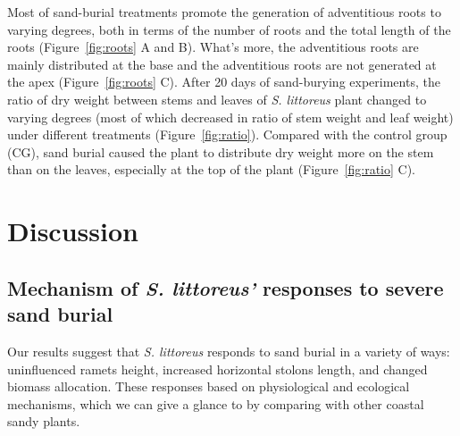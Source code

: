 \documentclass[]{interact}
\theoremstyle{plain}%
\theoremstyle{definition}
\theoremstyle{remark}
\begin{document}
Most of sand-burial treatments promote the generation of adventitious roots to varying degrees, both in terms of the number of roots and the total length of the roots (Figure~\ref{fig:roots} A and B).
What's more, the adventitious roots are mainly distributed at the base and the adventitious roots are not generated at the apex (Figure~\ref{fig:roots} C).
After 20 days of sand-burying experiments, the ratio of dry weight between stems and leaves of \textit{S. littoreus} plant changed to varying degrees (most of which decreased in ratio of stem weight and leaf weight) under different treatments (Figure~\ref{fig:ratio}).
Compared with the control group (CG), sand burial caused the plant to distribute dry weight more on the stem than on the leaves, especially at the top of the plant (Figure~\ref{fig:ratio} C).

\section{Discussion}

\subsection{Mechanism of \textit{\textit{S. littoreus}'} responses to severe sand burial}

Our results suggest that \textit{S. littoreus} responds to sand burial in a variety of ways: uninfluenced ramets height, increased horizontal stolons length, and changed biomass allocation.
These responses based on physiological and ecological mechanisms, which we can give a glance to by comparing with other coastal sandy plants.
\end{document}
